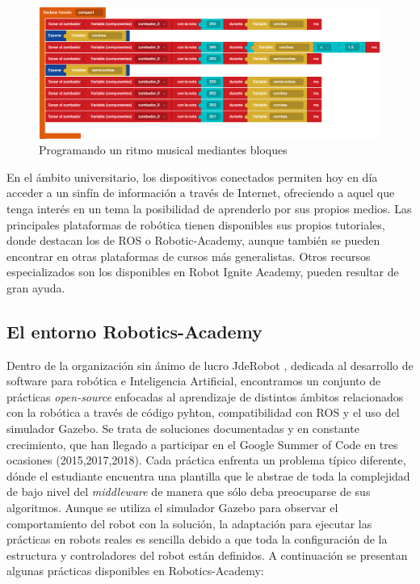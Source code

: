 \documentclass[12pt,spanish,chapterprefix, numbers=noenddot]{book}
\numberwithin{equation}{section}
\numberwithin{figure}{section}
\begin{document}
    \begin{figure}[h!]
    \centering
    \includegraphics[width=12cm]{Figs/compas_bitbloq.png}
    \par
    \caption{\label{fig:bitbloq}Programando un ritmo musical mediantes bloques}
    \end{figure}

En el ámbito universitario, los dispositivos conectados permiten hoy en día acceder a un sinfín de información a través de Internet, ofreciendo a aquel que tenga interés en un tema la posibilidad de aprenderlo por sus propios medios. 
Las principales plataformas de robótica tienen disponibles sus propios tutoriales, donde destacan los de ROS o Robotic-Academy, aunque también se pueden encontrar en otras plataformas de cursos más generalistas. Otros recursos especializados son los disponibles en Robot Ignite Academy, pueden resultar de gran ayuda. 

\subsection{El entorno Robotics-Academy}
Dentro de la organización sin ánimo de lucro JdeRobot \cite{jderobot}, dedicada al desarrollo de software para robótica e Inteligencia Artificial, encontramos un conjunto de prácticas \textit{open-source} enfocadas al aprendizaje de distintos ámbitos relacionados con la robótica a través de código pyhton, compatibilidad con ROS y el uso del simulador Gazebo. Se trata de soluciones documentadas y en constante crecimiento, que han llegado a participar en el Google Summer of Code en tres ocasiones (2015,2017,2018).
Cada práctica enfrenta un problema típico diferente, dónde el estudiante encuentra una plantilla que le abstrae de toda la complejidad de bajo nivel del \textit{middleware} de manera que sólo deba preocuparse de sus algoritmos. 
Aunque se utiliza el simulador Gazebo para observar el comportamiento del robot con la solución, la adaptación para ejecutar las prácticas en robots reales es sencilla debido a que toda la configuración de la estructura y controladores del robot están definidos. A continuación se presentan algunas prácticas disponibles en Robotics-Academy:
\end{document}
